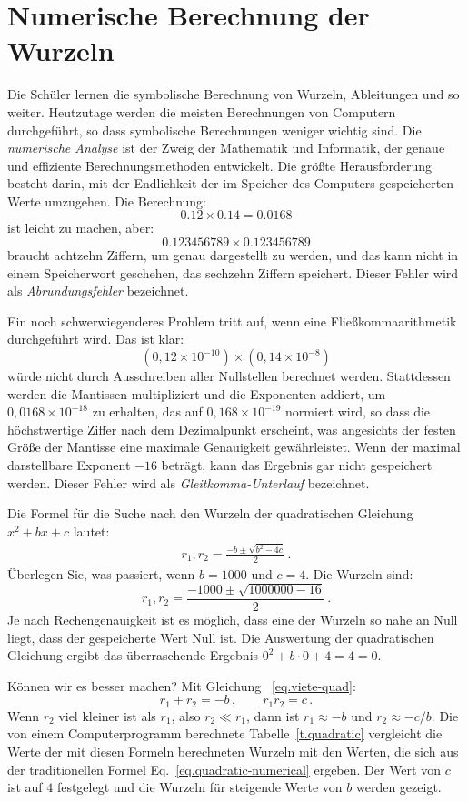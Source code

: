 \section{Numerische Berechnung der Wurzeln}\label{s.numerical}


Die Schüler lernen die symbolische Berechnung von Wurzeln, Ableitungen und so weiter. Heutzutage werden die meisten Berechnungen von Computern durchgeführt, so dass symbolische Berechnungen weniger wichtig sind. Die \emph{numerische Analyse} ist der Zweig der Mathematik und Informatik, der genaue und effiziente Berechnungsmethoden entwickelt. Die größte Herausforderung besteht darin, mit der Endlichkeit der im Speicher des Computers gespeicherten Werte umzugehen. Die Berechnung:
\[0.12\times 0.14=0.0168\]
ist leicht zu machen, aber:
\[
0.123456789\times 0.123456789
\]
braucht achtzehn Ziffern, um genau dargestellt zu werden, und das kann nicht in einem Speicherwort geschehen, das sechzehn Ziffern speichert. Dieser Fehler wird als \emph{Abrundungsfehler} bezeichnet.

Ein noch schwerwiegenderes Problem tritt auf, wenn eine Fließkommaarithmetik durchgeführt wird. Das ist klar:
\[(0,12\times 10^{-10})\times (0,14\times 10^{-8})\]
würde nicht durch Ausschreiben aller Nullstellen berechnet werden. Stattdessen werden die Mantissen multipliziert und die Exponenten addiert, um $0,0168\times 10^{-18}$ zu erhalten, das auf $0,168\times 10^{-19}$ normiert wird, so dass die höchstwertige Ziffer nach dem Dezimalpunkt erscheint, was angesichts der festen Größe der Mantisse eine maximale Genauigkeit gewährleistet. Wenn der maximal darstellbare Exponent $-16$ beträgt, kann das Ergebnis gar nicht gespeichert werden. Dieser Fehler wird als \emph{Gleitkomma-Unterlauf} bezeichnet.

Die Formel für die Suche nach den Wurzeln der quadratischen Gleichung $x^2+bx+c$ lautet:
\begin{align}
r_1, r_2 = \frac{-b\pm\sqrt{b^2-4c}}{2}\,.\label{eq.quadratic-numerical}
\end{align}
Überlegen Sie, was passiert, wenn $b=1000$ und $c=4$. Die Wurzeln sind:
\[
r_1, r_2 = \frac{-1000\pm\sqrt{1000000-16}}{2}\,.
\]
Je nach Rechengenauigkeit ist es möglich, dass eine der Wurzeln so nahe an Null liegt, dass der gespeicherte Wert Null ist. Die Auswertung der quadratischen Gleichung ergibt das überraschende Ergebnis $0^2+b\cdot 0 +4= 4= 0$.

Können wir es besser machen? Mit Gleichung ~\ref{eq.viete-quad}:
\[
r_1+r_2 = -b\,,\quad\quad r_1r_2=c\,.
\]
Wenn $r_2$ viel kleiner ist als $r_1$, also $r_2\ll r_1$, dann ist $r_1\approx -b$ und $r_2\approx -c/b$. Die von einem Computerprogramm berechnete Tabelle~\ref{t.quadratic} vergleicht die Werte der mit diesen Formeln berechneten Wurzeln mit den Werten, die sich aus der traditionellen Formel Eq.~\ref{eq.quadratic-numerical} ergeben. Der Wert von $c$ ist auf $4$ festgelegt und die Wurzeln für steigende Werte von $b$ werden gezeigt.

